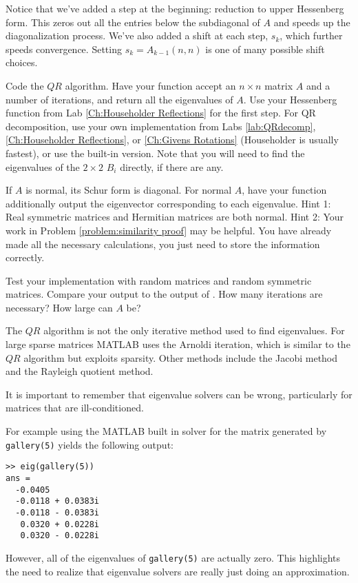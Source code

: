 Notice that we've added a step at the beginning: reduction to upper Hessenberg form. This zeros out all the entries below the subdiagonal of $A$ and speeds up the diagonalization process. We've also added a shift at each step, $s_k$, which further speeds convergence. Setting $s_k = A_{k-1}(n,n)$ is one of many possible shift choices.

\begin{problem}
Code the $QR$ algorithm. Have your function accept an $n \times n$ matrix $A$ and a number of iterations, and return all the eigenvalues of $A$. Use your Hessenberg function from Lab \ref{Ch:Householder Reflections} for the first step. For QR decomposition, use your own implementation from Labs \ref{lab:QRdecomp}, \ref{Ch:Householder Reflections}, or \ref{Ch:Givens Rotations} (Householder is usually fastest), or use the built-in version. Note that you will need to find the eigenvalues of the $2 \times 2$ $B_i$ directly, if there are any.
\end{problem}

\begin{problem}
If $A$ is normal, its Schur form is diagonal. For normal $A$, have your function additionally output the eigenvector corresponding to each eigenvalue. Hint 1: Real symmetric matrices and Hermitian matrices are both normal. Hint 2: Your work in Problem \ref{problem:similarity proof} may be helpful. You have already made all the necessary calculations, you just need to store the information correctly.
\end{problem}

\begin{problem}
Test your implementation with random matrices and random symmetric matrices. Compare your output to the output of . How many iterations are necessary? How large can $A$ be?
\end{problem}

The $QR$ algorithm is not the only iterative method used to find eigenvalues. For large sparse matrices MATLAB uses the Arnoldi iteration, which is similar to the $QR$ algorithm but exploits sparsity. Other methods include the Jacobi method and the Rayleigh quotient method.

It is important to remember that eigenvalue solvers can be wrong, particularly for matrices that are ill-conditioned. 
\begin{matlab}
For example using the MATLAB built in solver for the matrix generated by {\tt gallery(5)} yields the following output:
\begin{lstlisting}[style=matlab]
>> eig(gallery(5))
ans =
  -0.0405          
  -0.0118 + 0.0383i
  -0.0118 - 0.0383i
   0.0320 + 0.0228i
   0.0320 - 0.0228i
\end{lstlisting}

However, all of the eigenvalues of {\tt gallery(5)} are actually zero. This highlights the need to realize that eigenvalue solvers are really just doing an approximation.
\end{matlab}
